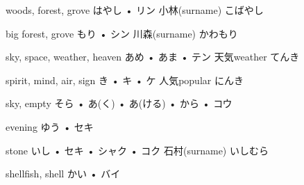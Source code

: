 



\setcounter{cardnum}{25}

		{woods, forest, grove}
		{はやし • リン}
		{小林}{(surname) こばやし}
		{}{}
		{}{}
		{}{}
		{}{}

		{big forest, grove}
		{もり • シン}
		{川森}{(surname) かわもり}
		{}{}
		{}{}
		{}{}
		{}{}

		{sky, space, weather, heaven}
		{あめ • あま • テン}
		{天気}{weather てんき}
		{}{}
		{}{}
		{}{}
		{}{}

		{spirit, mind, air, sign}
		{き • キ • ケ}
		{人気}{popular にんき}
		{}{}
		{}{}
		{}{}
		{}{}

		{sky, empty}
		{そら • あ(く) • あ(ける) • から • コウ}
		{}{}
		{}{}
		{}{}
		{}{}
		{}{}

		{evening}
		{ゆう • セキ}
		{}{}
		{}{}
		{}{}
		{}{}
		{}{}

		{stone}
		{いし • セキ • シャク • コク}
		{石村}{(surname) いしむら}
		{}{}
		{}{}
		{}{}
		{}{}

		{shellfish, shell}
		{かい • バイ}
		{}{}
		{}{}
		{}{}
		{}{}
		{}{}

